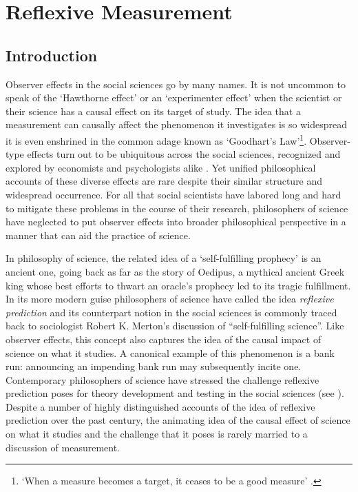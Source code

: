 \chapter{Reflexive Measurement}\label{ch_reflexivity}

\section{Introduction}

Observer effects in the social sciences go by many names. It is not uncommon to speak of the `Hawthorne effect' \autocite{landsberger1958} or an `experimenter effect' \autocite{rosenthal1966} when the scientist or their science has a causal effect on its target of study. The idea that a measurement can causally affect the phenomenon it investigates is so widespread it is even enshrined in the common adage known as `Goodhart's Law'\footnote{`When a measure becomes a target, it ceases to be a good measure' \autocite{goodhart1984}.}. Observer-type effects turn out to be ubiquitous across the social sciences, recognized and explored by economists and psychologists alike \autocite{friedman1953,gergen1973}. Yet unified philosophical accounts of these diverse effects are rare despite their similar structure and widespread occurrence. For all that social scientists have labored long and hard to mitigate these problems in the course of their research, philosophers of science have neglected to put observer effects into broader philosophical perspective in a manner that can aid the practice of science. 

In philosophy of science, the related idea of a `self-fulfilling prophecy' is an ancient one, going back as far as the story of Oedipus, a mythical ancient Greek king whose best efforts to thwart an oracle's prophecy led to its tragic fulfillment. In its more modern guise philosophers of science have called the idea \textit{reflexive prediction} and its counterpart notion in the social sciences is commonly traced back to sociologist Robert K. Merton's \autocite*{merton1948} discussion of ``self-fulfilling science''. Like observer effects, this concept also captures the idea of the causal impact of science on what it studies. A canonical example of this phenomenon is a bank run: announcing an impending bank run may subsequently incite one. Contemporary philosophers of science have stressed the challenge reflexive prediction poses for theory development and testing in the social sciences (see \cite{kopec2011, lowe2018}). Despite a number of highly distinguished accounts of the idea of reflexive prediction over the past century, the animating idea of the causal effect of science on what it studies and the challenge that it poses is rarely married to a discussion of measurement.

